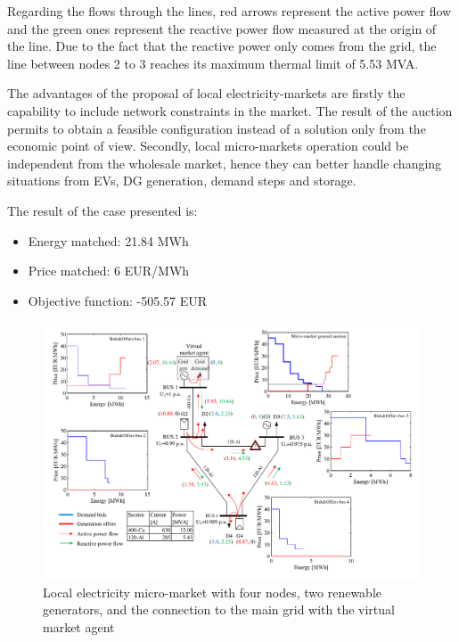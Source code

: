 \documentclass[a4paper,11pt,twoside,openright]{report}
\begin{document}
Regarding the flows through the lines, red arrows represent the active power flow and the green ones represent the reactive power flow measured at the origin of the line. Due to the fact that the reactive power only comes from the grid, the line between nodes 2 to 3 reaches its maximum thermal limit of 5.53 MVA.

The advantages of the proposal of local electricity-markets are firstly the capability to include network constraints in the market. The result of the auction permits to obtain a feasible configuration instead of a solution only from the economic point of view. Secondly, local micro-markets operation could be independent from the wholesale market, hence they can better handle changing situations from EVs, DG generation, demand steps and storage. 

The result of the case presented is:
\begin{itemize}
	\item Energy matched: 21.84 MWh
	\item Price matched: 6 EUR/MWh
	\item Objective function: -505.57 EUR
\end{itemize}

\begin{landscape}
	\begin{figure}[h!]
		\centering
		\includegraphics[scale=0.6]{Visios/Local_market_scheme}
		\caption{Local electricity micro-market with four nodes, two renewable generators, and the connection to the main grid with the virtual market agent}
		\label{fig:micro-market}
	\end{figure} 
\end{landscape}
\end{document}
